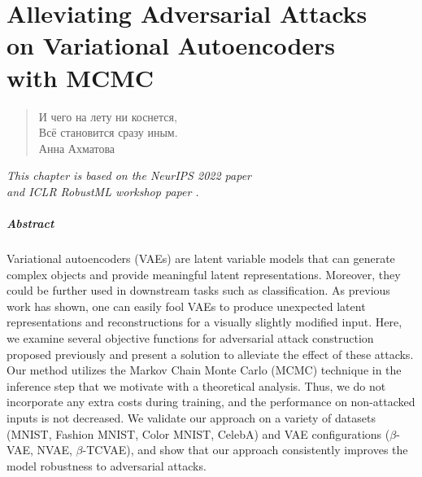 




\chapter[Alleviating Adversarial Attacks on VAEs with MCMC]{Alleviating Adversarial Attacks\\ on Variational Autoencoders\\ with MCMC}\label{chap:adv_att}

\begin{quote}
\normalsize\itshape
\begin{flushright}
\foreignlanguage{russian}{И чего на лету ни коснется,}\\
\foreignlanguage{russian}{Всё становится сразу иным.}  \\
\foreignlanguage{russian}{Анна Ахматова} \\ \vskip 20pt
\end{flushright}
\end{quote}

\begin{flushright}
	\small{
		\textit{
			\hfill This chapter is based on the NeurIPS 2022 paper \citep{kuzina2022alleviating} \\
			\hfill 	and ICLR RobustML workshop paper \citep{kuzina2021adv}.
		} 
		
	}
\end{flushright}

\paragraph{Abstract}
Variational autoencoders (VAEs) are latent variable models that can generate complex objects and provide meaningful latent representations. Moreover, they could be further used in downstream tasks such as classification. As previous work has shown, one can easily fool VAEs to produce unexpected latent representations and reconstructions for a visually slightly modified input. Here, we examine several objective functions for adversarial attack construction proposed previously and present a solution to alleviate the effect of these attacks. Our method utilizes the Markov Chain Monte Carlo (MCMC) technique in the inference step that we motivate with a theoretical analysis. Thus, we do not incorporate any extra costs during training, and the performance on non-attacked inputs is not decreased. We validate our approach on a variety of datasets (MNIST, Fashion MNIST, Color MNIST, CelebA) and VAE configurations ($\beta$-VAE, NVAE, $\beta$-TCVAE), and show that our approach consistently improves the model robustness to adversarial attacks.

